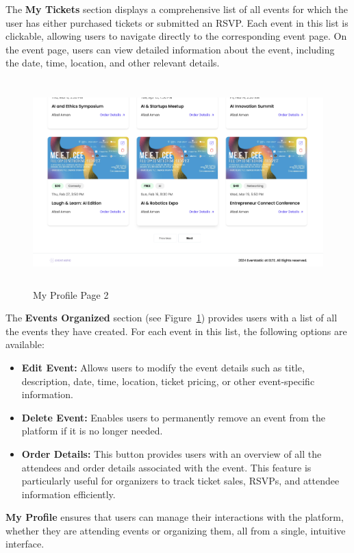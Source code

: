 The \textbf{My Tickets} section displays a comprehensive list of all events for which the user has either purchased tickets or submitted an RSVP. Each event in this list is clickable, allowing users to navigate directly to the corresponding event page. On the event page, users can view detailed information about the event, including the date, time, location, and other relevant details.

\begin{figure}[H]
	\centering	\includegraphics[width=1.0\textwidth,height=300px,frame]{images/profile2.png}
	\caption{My Profile Page 2}
        \label{fig:profile2}
\end{figure}


The \textbf{Events Organized} section (see Figure~\ref{fig:profile2}) provides users with a list of all the events they have created. For each event in this list, the following options are available:
\begin{itemize}
    \item \textbf{Edit Event:} Allows users to modify the event details such as title, description, date, time, location, ticket pricing, or other event-specific information.
    \item \textbf{Delete Event:} Enables users to permanently remove an event from the platform if it is no longer needed.
    \item \textbf{Order Details:} This button provides users with an overview of all the attendees and order details associated with the event. This feature is particularly useful for organizers to track ticket sales, RSVPs, and attendee information efficiently.
\end{itemize}

\textbf{My Profile} ensures that users can manage their interactions with the platform, whether they are attending events or organizing them, all from a single, intuitive interface.



